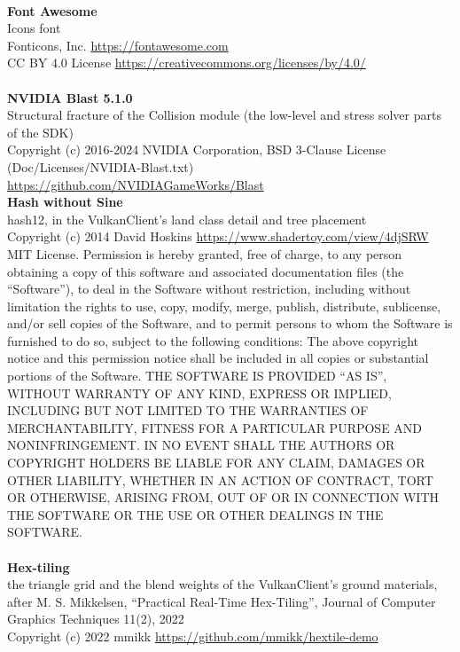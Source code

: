 \documentclass[Orbiter User Manual.tex]{subfiles}
\begin{document}
\\
\textbf{Font Awesome}\\
Icons font\\
Fonticons, Inc. \url{https://fontawesome.com}\\
CC BY 4.0 License \url{https://creativecommons.org/licenses/by/4.0/}\\
\\
\textbf{NVIDIA Blast 5.1.0}\\
Structural fracture of the Collision module (the low-level and stress solver parts of the SDK)\\
Copyright (c) 2016-2024 NVIDIA Corporation, BSD 3-Clause License (Doc/Licenses/NVIDIA-Blast.txt)\\
\url{https://github.com/NVIDIAGameWorks/Blast}\\
\textbf{Hash without Sine}\\
hash12, in the VulkanClient's land class detail and tree placement\\
Copyright (c) 2014 David Hoskins \url{https://www.shadertoy.com/view/4djSRW}\\
MIT License. Permission is hereby granted, free of charge, to any person obtaining a copy of this software and associated documentation files (the ``Software''), to deal in the Software without restriction, including without limitation the rights to use, copy, modify, merge, publish, distribute, sublicense, and/or sell copies of the Software, and to permit persons to whom the Software is furnished to do so, subject to the following conditions: The above copyright notice and this permission notice shall be included in all copies or substantial portions of the Software. THE SOFTWARE IS PROVIDED ``AS IS'', WITHOUT WARRANTY OF ANY KIND, EXPRESS OR IMPLIED, INCLUDING BUT NOT LIMITED TO THE WARRANTIES OF MERCHANTABILITY, FITNESS FOR A PARTICULAR PURPOSE AND NONINFRINGEMENT. IN NO EVENT SHALL THE AUTHORS OR COPYRIGHT HOLDERS BE LIABLE FOR ANY CLAIM, DAMAGES OR OTHER LIABILITY, WHETHER IN AN ACTION OF CONTRACT, TORT OR OTHERWISE, ARISING FROM, OUT OF OR IN CONNECTION WITH THE SOFTWARE OR THE USE OR OTHER DEALINGS IN THE SOFTWARE.\\
\\
\textbf{Hex-tiling}\\
the triangle grid and the blend weights of the VulkanClient's ground materials, after M. S. Mikkelsen, ``Practical Real-Time Hex-Tiling'', Journal of Computer Graphics Techniques 11(2), 2022\\
Copyright (c) 2022 mmikk \url{https://github.com/mmikk/hextile-demo}\\
\end{document}
